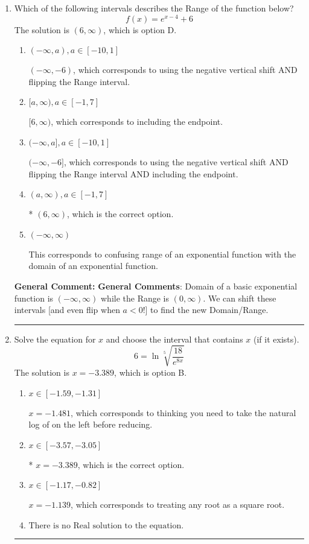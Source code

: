 \documentclass{extbook}[14pt]
\newcommand{\litem}[1]{\item #1

\rule{\textwidth}{0.4pt}}
\begin{document}
\begin{enumerate}\litem{
Which of the following intervals describes the Range of the function below?
\[ f(x) = e^{x-4}+6 \]The solution is \( (6, \infty) \), which is option D.\begin{enumerate}[label=\Alph*.]
\item \( (-\infty, a), a \in [-10, 1] \)

$(-\infty, -6)$, which corresponds to using the negative vertical shift AND flipping the Range interval.
\item \( [a, \infty), a \in [-1, 7] \)

$[6, \infty)$, which corresponds to including the endpoint.
\item \( (-\infty, a], a \in [-10, 1] \)

$(-\infty, -6]$, which corresponds to using the negative vertical shift AND flipping the Range interval AND including the endpoint.
\item \( (a, \infty), a \in [-1, 7] \)

* $(6, \infty)$, which is the correct option.
\item \( (-\infty, \infty) \)

This corresponds to confusing range of an exponential function with the domain of an exponential function.
\end{enumerate}

\textbf{General Comment:} \textbf{General Comments}: Domain of a basic exponential function is $(-\infty, \infty)$ while the Range is $(0, \infty)$. We can shift these intervals [and even flip when $a<0$!] to find the new Domain/Range.
}
\litem{
 Solve the equation for $x$ and choose the interval that contains $x$ (if it exists).
\[  6 = \ln{\sqrt[5]{\frac{18}{e^{8x}}}} \]The solution is \( x = -3.389 \), which is option B.\begin{enumerate}[label=\Alph*.]
\item \( x \in [-1.59, -1.31] \)

$x = -1.481$, which corresponds to thinking you need to take the natural log of on the left before reducing.
\item \( x \in [-3.57, -3.05] \)

* $x = -3.389$, which is the correct option.
\item \( x \in [-1.17, -0.82] \)

$x = -1.139$, which corresponds to treating any root as a square root.
\item \( \text{There is no Real solution to the equation.} \)


\end{enumerate}}
\end{enumerate}
\end{document}
